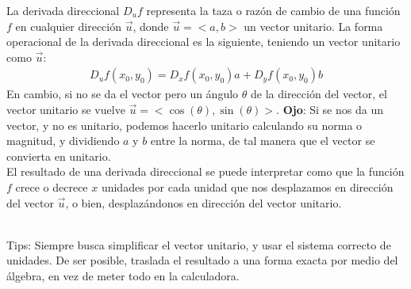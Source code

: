 \documentclass[12pt, letterpaper]{report}
\begin{document}
La derivada direccional $D_uf$ representa la taza o razón de cambio de una función $f$ en cualquier dirección $\vec{u}$, donde $\vec{u} = <a, b>$ un vector unitario. La 
forma operacional de la derivada direccional es la siguiente, teniendo un vector unitario como $\vec{u}$: 
\begin{align}
D_uf(x_0, y_0) = D_xf(x_0, y_0)a + D_yf(x_0, y_0)b
\end{align}
En cambio, si no se da el vector pero un ángulo $\theta$ de la dirección del vector, el vector unitario se vuelve $\vec{u} = <\cos(\theta), \sin(\theta)>$. 
\textbf{Ojo}: Si se nos da un vector, y no es unitario, podemos hacerlo unitario calculando su norma o magnitud, y dividiendo $a$ y $b$ entre la norma, de tal manera 
que el vector se convierta en unitario. \\ 
El resultado de una derivada direccional se puede interpretar como que la función $f$ crece o decrece $x$ unidades por cada 
unidad que nos desplazamos en dirección del vector $\vec{u}$, o bien, desplazándonos en dirección del vector unitario. \\ 

Tips: Siempre busca simplificar el vector unitario, y usar el sistema correcto de unidades. De ser posible, traslada el 
resultado a una forma exacta por medio del álgebra, en vez de meter todo en la calculadora. \\ 
\end{document}
